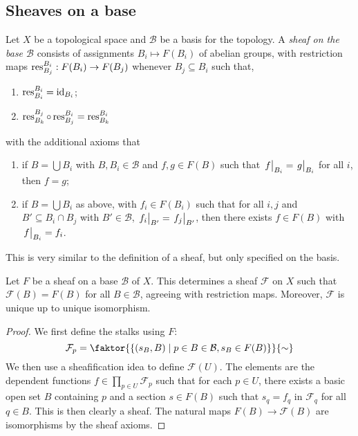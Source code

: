\subsection{Sheaves on a base}
\begin{definition}
    Let \( X \) be a topological space and \( \mathcal B \) be a basis for the topology.
    A \emph{sheaf on the base \( \mathcal B \)} consists of assignments \( B_i \mapsto F(B_i) \) of abelian groups, with restriction maps \( \operatorname{res}_{B_j}^{B_i} : F(B_i) \to F(B_j) \) whenever \( B_j \subseteq B_i \) such that,
    \begin{enumerate}
        \item \( \operatorname{res}^{B_i}_{B_i} = \operatorname{id}_{B_i} \);
        \item \( \operatorname{res}^{B_j}_{B_k} \circ \operatorname{res}^{B_i}_{B_j} = \operatorname{res}^{B_i}_{B_k} \)
    \end{enumerate}
    with the additional axioms that
    \begin{enumerate}
        \item if \( B = \bigcup B_i \) with \( B, B_i \in \mathcal B \) and \( f, g \in F(B) \) such that \( \eval{f}_{B_i} = \eval{g}_{B_i} \) for all \( i \), then \( f = g \);
        \item if \( B = \bigcup B_i \) as above, with \( f_i \in F(B_i) \) such that for all \( i, j \) and \( B' \subseteq B_i \cap B_j \) with \( B' \in \mathcal B \), \( \eval{f_i}_{B'} = \eval{f_j}_{B'} \), then there exists \( f \in F(B) \) with \( \eval{f}_{B_i} = f_i \).
    \end{enumerate}
\end{definition}
This is very similar to the definition of a sheaf, but only specified on the basis.
\begin{proposition}
    Let \( F \) be a sheaf on a base \( \mathcal B \) of \( X \).
    This determines a sheaf \( \mathcal F \) on \( X \) such that \( \mathcal F(B) = F(B) \) for all \( B \in \mathcal B \), agreeing with restriction maps.
    Moreover, \( \mathcal F \) is unique up to unique isomorphism.
\end{proposition}
\begin{proof}
    We first define the stalks using \( F \):
    \[ \mathcal F_p = \faktor{\qty{(s_B, B) \mid p \in B \in \mathcal B, s_B \in F(B)}}{\sim} \]
    We then use a sheafification idea to define \( \mathcal F(U) \).
    The elements are the dependent functions \( f \in \prod_{p \in U} \mathcal F_p \) such that for each \( p \in U \), there exists a basic open set \( B \) containing \( p \) and a section \( s \in F(B) \) such that \( s_q = f_q \) in \( \mathcal F_q \) for all \( q \in B \).
    This is then clearly a sheaf.
    The natural maps \( F(B) \to \mathcal F(B) \) are isomorphisms by the sheaf axioms.
\end{proof}
